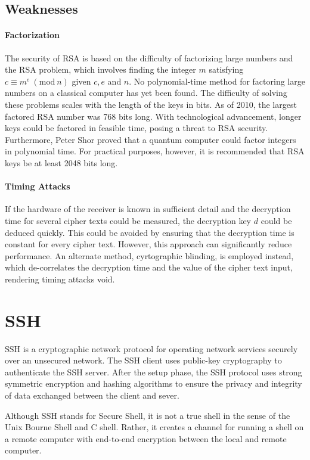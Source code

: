 \documentclass{article}
\begin{document}
    \subsection{Weaknesses}
        \paragraph{Factorization} The security of RSA is based on the difficulty of factorizing large numbers and the RSA problem, which involves finding the integer $m$ satisfying $c \equiv m^e \ (\mathrm{mod} \ n)$ given $c, e$ and $n$. No polynomial-time method for factoring large numbers on a classical computer has yet been found. The difficulty of solving these problems scales with the length of the keys in bits. As of 2010, the largest factored RSA number was 768 bits long. With technological advancement, longer keys could be factored in feasible time, posing a threat to RSA security. Furthermore, Peter Shor proved that a quantum computer could factor integers in polynomial time. For practical purposes, however, it is recommended that RSA keys be at least 2048 bits long.
        
        \paragraph{Timing Attacks} If the hardware of the receiver is known in sufficient detail and the decryption time for several cipher texts could be measured, the decryption key $d$ could be deduced quickly. This could be avoided by ensuring that the decryption time is constant for every cipher text. However, this approach can significantly reduce performance. An alternate method, cyrtographic blinding, is employed instead, which de-correlates the decryption time and the value of the cipher text input, rendering timing attacks void. 
        
\section{SSH}
    SSH is a cryptographic network protocol for operating network services securely over an unsecured network. The SSH client uses public-key cryptography to authenticate the SSH server. After the setup phase, the SSH protocol uses strong symmetric encryption and hashing algorithms to ensure the privacy and integrity of data exchanged between the client and sever.
    
    Although SSH stands for Secure Shell, it is not a true shell in the sense of the Unix Bourne Shell and C shell. Rather, it creates a channel for running a shell on a remote computer with end-to-end encryption between the local and remote computer. 
    
\end{document}
